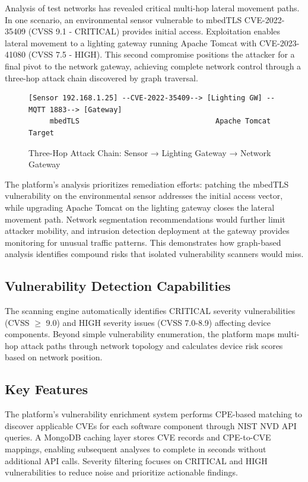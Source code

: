 \documentclass[11pt,a4paper]{article}
\begin{document}
Analysis of test networks has revealed critical multi-hop lateral movement paths. In one scenario, an environmental sensor vulnerable to mbedTLS CVE-2022-35409 (CVSS 9.1 - CRITICAL) provides initial access. Exploitation enables lateral movement to a lighting gateway running Apache Tomcat with CVE-2023-41080 (CVSS 7.5 - HIGH). This second compromise positions the attacker for a final pivot to the network gateway, achieving complete network control through a three-hop attack chain discovered by graph traversal.

\begin{figure}[H]
\centering
\begin{verbatim}
[Sensor 192.168.1.25] --CVE-2022-35409--> [Lighting GW] --MQTT 1883--> [Gateway]
     mbedTLS                                Apache Tomcat              Target
\end{verbatim}
\caption{Three-Hop Attack Chain: Sensor → Lighting Gateway → Network Gateway}
\label{fig:attack_chain}
\end{figure}

The platform's analysis prioritizes remediation efforts: patching the mbedTLS vulnerability on the environmental sensor addresses the initial access vector, while upgrading Apache Tomcat on the lighting gateway closes the lateral movement path. Network segmentation recommendations would further limit attacker mobility, and intrusion detection deployment at the gateway provides monitoring for unusual traffic patterns. This demonstrates how graph-based analysis identifies compound risks that isolated vulnerability scanners would miss.

\subsection{Vulnerability Detection Capabilities}

The scanning engine automatically identifies CRITICAL severity vulnerabilities (CVSS $\geq$ 9.0) and HIGH severity issues (CVSS 7.0-8.9) affecting device components. Beyond simple vulnerability enumeration, the platform maps multi-hop attack paths through network topology and calculates device risk scores based on network position.

\newpage
\subsection{Key Features}

The platform's vulnerability enrichment system performs CPE-based matching to discover applicable CVEs for each software component through NIST NVD API queries. A MongoDB caching layer stores CVE records and CPE-to-CVE mappings, enabling subsequent analyses to complete in seconds without additional API calls. Severity filtering focuses on CRITICAL and HIGH vulnerabilities to reduce noise and prioritize actionable findings.
\end{document}
